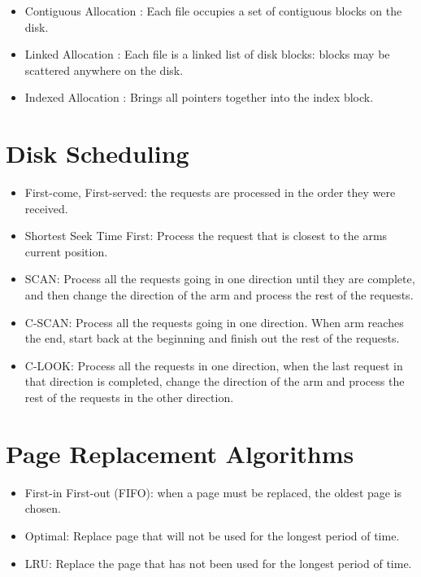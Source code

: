 \documentclass{article}
\begin{document}
\begin{multicols}{2}
    \begin{itemize}
      \item Contiguous Allocation : Each file occupies a set of contiguous blocks on the disk.
      \item Linked Allocation : Each file is a linked list of disk blocks: blocks may be scattered
        anywhere on the disk.
      \item Indexed Allocation : Brings all pointers together into the index block.
    \end{itemize}

    \section*{Disk Scheduling}

    \begin{itemize}
      \item First-come, First-served: the requests are processed in the order they were received.
      \item Shortest Seek Time First: Process the request that is closest to the arms current
        position.
      \item SCAN: Process all the requests going in one direction until they are complete, and then
        change the direction of the arm and process the rest of the requests.
      \item C-SCAN: Process all the requests going in one direction. When arm reaches the end, start
        back at the beginning and finish out the rest of the requests.
      \item C-LOOK: Process all the requests in one direction, when the last request in that direction
        is completed, change the direction of the arm and process the rest of the requests in the
        other direction.
    \end{itemize}

    \section*{Page Replacement Algorithms}

    \begin{itemize}
      \item First-in First-out (FIFO): when a page must be replaced, the oldest page is chosen.
      \item Optimal: Replace page that will not be used for the longest period of time.
      \item LRU: Replace the page that has not been used for the longest period of time.
    \end{itemize}


\end{multicols}
\end{document}
